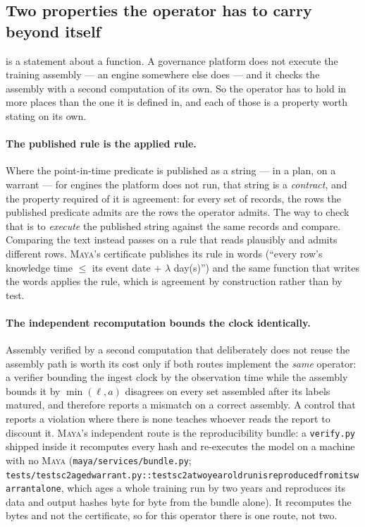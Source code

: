 \documentclass[11pt,a4paper]{article}
\renewcommand{\_}{\oldunderscore\allowbreak}
\theoremstyle{plain}
\theoremstyle{definition}
\theoremstyle{definition}
\theoremstyle{remark}
\begin{document}
\subsection{Two properties the operator has to carry beyond itself}\label{sec:operatorfound}

 is a statement about a function. A governance platform does not execute the training
assembly --- an engine somewhere else does --- and it checks the assembly with a second computation of its
own. So the operator has to hold in more places than the one it is defined in, and each of those is a
property worth stating on its own.

\paragraph{The published rule is the applied rule.} Where the point-in-time predicate is published as a
string --- in a plan, on a warrant --- for engines the platform does not run, that string is a
\emph{contract}, and the property required of it is agreement: for every set of records, the rows the
published predicate admits are the rows the operator admits. The way to check that is to \emph{execute}
the published string against the same records and compare. Comparing the text instead passes on a rule
that reads plausibly and admits different rows. \textsc{Maya}'s certificate publishes its rule in words
(``every row's knowledge time $\le$ its event date + $\lambda$ day(s)'') and the same function that writes
the words applies the rule, which is agreement by construction rather than by test.

\paragraph{The independent recomputation bounds the clock identically.} Assembly verified by a second
computation that deliberately does not reuse the assembly path is worth its cost only if both routes
implement the \emph{same} operator: a verifier bounding the ingest clock by the observation time while the
assembly bounds it by $\min(\ell,a)$ disagrees on every set assembled after its labels matured, and
therefore reports a mismatch on a correct assembly. A control that reports a violation where there is
none teaches whoever reads the report to discount it. \textsc{Maya}'s independent route is the
reproducibility bundle: a \texttt{verify.py} shipped inside it recomputes every hash and re-executes the
model on a machine with no \textsc{Maya} (\texttt{maya/services/bundle.py};
\texttt{tests/test\_sc2\_aged\_warrant.py::test\_sc2\_a\_two\_year\_old\_run\_is\_reproduced\_from\_its\_warrant\_alone},
which ages a whole training run by two years and reproduces its data and output hashes byte for byte from
the bundle alone). It recomputes the bytes and not the certificate, so for this operator there is one
route, not two.
\end{document}
